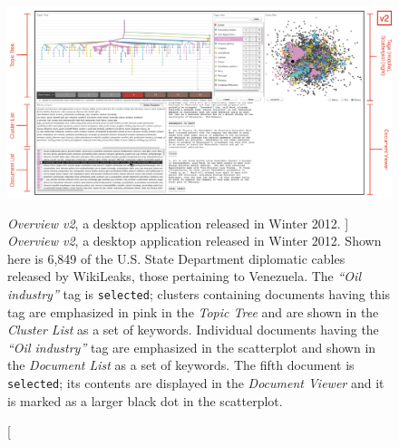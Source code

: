 
\begin{figure}
	\centering
	\includegraphics[width=\textwidth]{figures/overview-v2-annotated.png}
	\caption
	[
	    \textsl{Overview v2}, a desktop application released in Winter 2012.
	]
	{
    	\textsl{Overview v2}, a desktop application released in Winter 2012.
    	Shown here is 6,849 of the U.S. State Department diplomatic cables released by WikiLeaks, those pertaining to Venezuela.
    	The \textsl{``Oil industry''} tag is {\tt selected}; clusters containing documents having this tag are emphasized in pink in the \textsl{Topic Tree} and are shown in the \textsl{Cluster List} as a set of keywords.
    	Individual documents having the \textsl{``Oil industry''} tag are emphasized in the scatterplot and shown in the \textsl{Document List} as a set of keywords.
    	The fifth document is {\tt selected}; its contents are displayed in the \textsl{Document Viewer} and it is marked as a larger black dot in the scatterplot.
	}
	\centering
	\label{overview:fig:overview-v2}
\end{figure}



